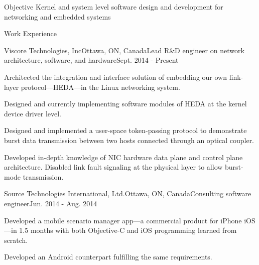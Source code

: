 \documentclass{resume} %
\begin{document}

\begin{rSection}{Objective}
Kernel and system level software design and development for networking and embedded systems
\end{rSection}


\begin{rSection}{Work Experience}

\begin{rSubsection}{Viscore Technologies, Inc}{Ottawa, ON, Canada}{Lead R\&D engineer on network architecture, software, and hardware}{Sept. 2014 - Present}
\item Architected the integration and interface solution of embedding our own link-layer protocol---HEDA---in the Linux networking system.
\item Designed and currently implementing software modules of HEDA at the kernel device driver level.
\item Designed and implemented a user-space token-passing protocol to demonstrate burst data transmission between two hosts connected through an optical coupler.
\item Developed in-depth knowledge of NIC hardware data plane and control plane architecture. Disabled link fault signaling at the physical layer to allow burst-mode transmission.
\end{rSubsection}


\begin{rSubsection}{Source Technologies International, Ltd.}{Ottawa, ON, Canada}{Consulting software engineer}{Jun. 2014 - Aug. 2014}
\item Developed a mobile scenario manager app---a commercial product for iPhone iOS---in 1.5 months with both Objective-C and iOS programming learned from scratch.
\item Developed an Android counterpart fulfilling the same requirements.
\end{rSubsection}

\end{rSection}
\end{document}
